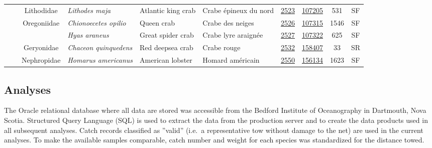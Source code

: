 \documentclass[12pt]{article}\usepackage[]{graphicx}\usepackage[]{color}
\begin{document}
\begin{landscapepage}
\begin{longtable}[t]{ccc>{\centering\arraybackslash}p{3cm}>{\centering\arraybackslash}p{3cm}>{\centering\arraybackslash}p{3cm}>{}c>{}ccc}
\nopagebreak
\hspace{1em}\hspace{1em} &  & Lithodidae & \em{Lithodes maja} & Atlantic king crab & Crabe épineux du nord & \href{#sec:2523}{2523} & \href{http://www.marinespecies.org/aphia.php?p=taxdetails&id=107205}{107205} & 531 & SF\\
\nopagebreak
\hspace{1em}\hspace{1em} &  & Oregoniidae & \em{Chionoecetes opilio} & Queen crab & Crabe des neiges & \href{#sec:2526}{2526} & \href{http://www.marinespecies.org/aphia.php?p=taxdetails&id=107315}{107315} & 1546 & SF\\
\nopagebreak
\hspace{1em}\hspace{1em} &  &  & \em{Hyas araneus} & Great spider crab & Crabe lyre araignée & \href{#sec:2527}{2527} & \href{http://www.marinespecies.org/aphia.php?p=taxdetails&id=107322}{107322} & 625 & SF\\
\nopagebreak
\hspace{1em}\hspace{1em} &  & Geryonidae & \em{Chaceon quinquedens} & Red deepsea crab & Crabe rouge & \href{#sec:2532}{2532} & \href{http://www.marinespecies.org/aphia.php?p=taxdetails&id=158407}{158407} & 33 & SR\\
\nopagebreak
\hspace{1em}\hspace{1em} &  & Nephropidae & \em{Homarus americanus} & American lobster & Homard américain & \href{#sec:2550}{2550} & \href{http://www.marinespecies.org/aphia.php?p=taxdetails&id=156134}{156134} & 1623 & SF\\*
\end{longtable}
\endgroup{}
\end{landscapepage}
\hypertarget{analyses}{%
\subsection{Analyses}\label{analyses}}

The Oracle relational database where all data are stored was accessible from the Bedford Institute of Oceanography in Dartmouth, Nova Scotia. Structured Query Language (SQL) is used to extract the data from the production server and to create the data products used in all subsequent analyses. Catch records classified as ''valid'' (i.e.~a representative tow without damage to the net) are used in the current analyses. To make the available samples comparable, catch number and weight for each species was standardized for the distance towed.
\end{document}
